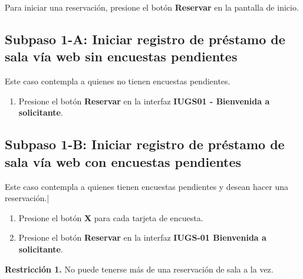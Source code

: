 Para iniciar una reservación, presione el botón \textbf{Reservar} en 
la pantalla de inicio.

\subsection{Subpaso 1-A: Iniciar registro de préstamo de sala vía web sin encuestas pendientes}
Este caso contempla a quienes no tienen encuestas pendientes.
\begin{enumerate}
	\item Presione el botón \textbf{Reservar} en la interfaz
		\textbf{IUGS01 - Bienvenida a solicitante}.
\end{enumerate}

\subsection{Subpaso 1-B: Iniciar registro de préstamo de sala vía web con encuestas pendientes}
Este caso contempla a quienes tienen encuestas pendientes y
desean hacer una reservación.|
\begin{enumerate}
	\item Presione el botón \textbf{X} para cada tarjeta de encuesta.
	\item Presione el botón \textbf{Reservar} en la interfaz
		\textbf{IUGS-01 Bienvenida a solicitante}.
\end{enumerate}

\textbf{Restricción 1.} No puede tenerse más de una reservación de sala
	a la vez.